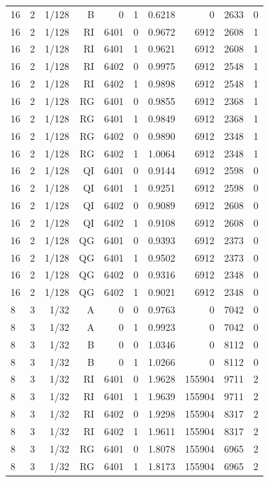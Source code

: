\begin{longtable}{lrrrrrrrrr}
16 & 2 & 1/128 & B & 0 & 1 & 0.6218 & 0 & 2633 & 0 \\
16 & 2 & 1/128 & RI & 6401 & 0 & 0.9672 & 6912 & 2608 & 1 \\
16 & 2 & 1/128 & RI & 6401 & 1 & 0.9621 & 6912 & 2608 & 1 \\
16 & 2 & 1/128 & RI & 6402 & 0 & 0.9975 & 6912 & 2548 & 1 \\
16 & 2 & 1/128 & RI & 6402 & 1 & 0.9898 & 6912 & 2548 & 1 \\
16 & 2 & 1/128 & RG & 6401 & 0 & 0.9855 & 6912 & 2368 & 1 \\
16 & 2 & 1/128 & RG & 6401 & 1 & 0.9849 & 6912 & 2368 & 1 \\
16 & 2 & 1/128 & RG & 6402 & 0 & 0.9890 & 6912 & 2348 & 1 \\
16 & 2 & 1/128 & RG & 6402 & 1 & 1.0064 & 6912 & 2348 & 1 \\
16 & 2 & 1/128 & QI & 6401 & 0 & 0.9144 & 6912 & 2598 & 0 \\
16 & 2 & 1/128 & QI & 6401 & 1 & 0.9251 & 6912 & 2598 & 0 \\
16 & 2 & 1/128 & QI & 6402 & 0 & 0.9089 & 6912 & 2608 & 0 \\
16 & 2 & 1/128 & QI & 6402 & 1 & 0.9108 & 6912 & 2608 & 0 \\
16 & 2 & 1/128 & QG & 6401 & 0 & 0.9393 & 6912 & 2373 & 0 \\
16 & 2 & 1/128 & QG & 6401 & 1 & 0.9502 & 6912 & 2373 & 0 \\
16 & 2 & 1/128 & QG & 6402 & 0 & 0.9316 & 6912 & 2348 & 0 \\
16 & 2 & 1/128 & QG & 6402 & 1 & 0.9021 & 6912 & 2348 & 0 \\
8 & 3 & 1/32 & A & 0 & 0 & 0.9763 & 0 & 7042 & 0 \\
8 & 3 & 1/32 & A & 0 & 1 & 0.9923 & 0 & 7042 & 0 \\
8 & 3 & 1/32 & B & 0 & 0 & 1.0346 & 0 & 8112 & 0 \\
8 & 3 & 1/32 & B & 0 & 1 & 1.0266 & 0 & 8112 & 0 \\
8 & 3 & 1/32 & RI & 6401 & 0 & 1.9628 & 155904 & 9711 & 2 \\
8 & 3 & 1/32 & RI & 6401 & 1 & 1.9639 & 155904 & 9711 & 2 \\
8 & 3 & 1/32 & RI & 6402 & 0 & 1.9298 & 155904 & 8317 & 2 \\
8 & 3 & 1/32 & RI & 6402 & 1 & 1.9611 & 155904 & 8317 & 2 \\
8 & 3 & 1/32 & RG & 6401 & 0 & 1.8078 & 155904 & 6965 & 2 \\
8 & 3 & 1/32 & RG & 6401 & 1 & 1.8173 & 155904 & 6965 & 2 \\

\end{longtable}
